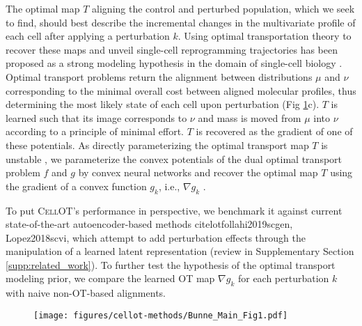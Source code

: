 The optimal map $T$ aligning the control and perturbed population, which we seek to find, should best describe the incremental changes in the multivariate profile of each cell after applying a perturbation $k$.
Using optimal transportation theory \cite{villani2021topics, santambrogio2015optimal} to recover these maps and unveil single-cell reprogramming trajectories has been proposed as a strong modeling hypothesis in the domain of single-cell biology \cite{schiebinger2019optimal, cang2020inferring, demetci2020gromov, huizing2021optimal, lavenant2021towards, zhang2021optimal}.
Optimal transport problems return the alignment between distributions $\mu$ and $\nu$ corresponding to the minimal overall cost between aligned molecular profiles, thus determining the most likely state of each cell upon perturbation (Fig \ref{fig:cellot-overview}c).
$T$ is learned such that its image corresponds to $\nu$ and mass is moved from $\mu$ into $\nu$ according to a principle of minimal effort.
$T$ is recovered as the gradient of one of these potentials.
As directly parameterizing the optimal transport map $T$ \cite{korotin2019wasserstein, yang2018scalable, prasad2020optimal} is unstable \citep[Table 1]{makkuva2020optimal}, we parameterize the convex potentials of the dual optimal transport problem $f$ and $g$ by convex neural networks \cite{amos2017input} and recover the optimal map $T$ using the gradient of a convex function $g_k$, i.e., $\nabla g_k$ \cite{makkuva2020optimal}.

To put \textsc{CellOT}'s performance in perspective, we benchmark it against current state-of-the-art autoencoder-based methods cite{lotfollahi2019scgen, Lopez2018scvi},
which attempt to add perturbation effects through the manipulation of a learned latent representation (review in Supplementary Section \ref{supp:related_work}).
To further test the hypothesis of the optimal transport modeling prior, we compare the learned OT map $\nabla g_k$ for each perturbation $k$ with naive non-OT-based alignments.


\begin{figure}
  \begin{center}
    \texttt{[image: figures/cellot-methods/Bunne\_Main\_Fig1.pdf]}
  \end{center}
  \caption{}\label{fig:cellot-overview}
\end{figure}

